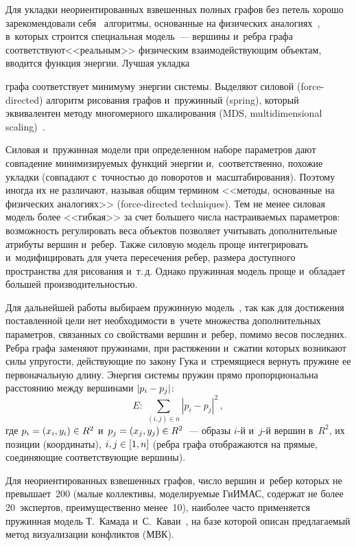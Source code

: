 \begin{multicols}{2}
  Для укладки неориентированных взвешенных полных графов без петель 
хорошо 
 зарекомендовали себя~\cite{12-rum}  алгоритмы, основанные на физических  
аналогиях~\cite{8-rum, 9-rum, 10-rum}, в~которых строится специальная 
модель~--- вершины и~ребра графа соответствуют\linebreak <<реальным>> физическим 
взаимодействующим объектам, вводится функция энергии. Лучшая укладка\linebreak
\vspace*{-12pt} 

\columnbreak

\noindent
графа соответствует минимуму энергии сис\-те\-мы. Выделяют силовой 
(force-directed) алгоритм рисования графов и~пружинный (spring), который 
эквивалентен методу многомерного шкалирования (MDS, multidimensional 
scaling)~\cite{16-rum}. 
  
  Силовая и~пружинная модели при определенном наборе параметров дают 
совпадение минимизируемых функций энергии и,~соответственно, \mbox{похожие} 
укладки (совпадают с~точ\-ностью до поворотов и~масштабирования). Поэтому 
иногда их не различают, называя общим термином <<методы, основанные на 
физических аналогиях>> (force-directed techniques). Тем не менее силовая 
модель более <<гибкая>> за счет большего числа настраиваемых параметров: 
возможность регулировать веса объектов позволяет учитывать 
дополнительные атрибуты вершин и~ребер. Также силовую модель проще 
интегрировать и~модифицировать для учета пересечения ребер, размера 
доступного пространства для рисования и~т.\,д. Однако пружинная модель 
проще и~обладает большей производительностью. 
  
  Для дальнейшей работы выбираем пружинную модель~\cite{17-rum}, так как  
для достижения поставленной цели нет необходимости в~учете множества 
дополнительных параметров, связанных со свойствами вершин и~ребер, 
помимо весов последних. Реб\-ра графа заменяют пружинами, при растяжении и~сжатии которых 
возникают силы упругости, действующие по закону Гука и~стремящиеся 
вернуть пружине ее первоначальную длину. Энергия системы 
пружин прямо пропорциональна расстоянию между вершинами $\vert p_i\hm- 
p_j\vert$:
  $$
  E:\ \sum\limits_{(i,j)\in n} \left\vert p_i -p_j\right\vert^2\,,
  $$
где $p_i=(x_i,y_i)\hm\in R^2$ и~$p_j\hm= (x_j,y_j)\hm\in R^2$~--- образы $i$-й 
и~$j$-й вершин в~$R^2$, их позиции (координаты), $i,j\hm\in [1,n]$ (ребра 
графа отображаются на прямые, соединяющие соответствующие вершины).
  
  Для неориентированных взвешенных графов, число вершин и~ребер 
которых не превышает~200 (малые коллективы, моделируемые 
\mbox{ГиИМАС}, содержат не более 20~экспертов, преимущественно 
менее~10), наиболее часто применяется пружинная модель Т.~Камада 
и~С.~Каваи~\cite{9-rum}, на базе которой описан предлагаемый метод 
визуализации конфликтов (МВК).
     

\end{multicols}
